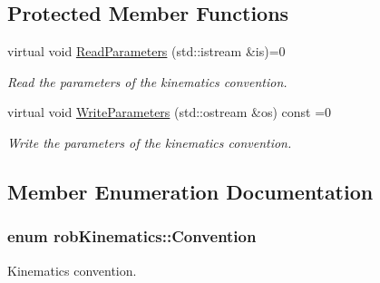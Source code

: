 \subsection*{Protected Member Functions}
\begin{DoxyCompactItemize}
\item 
virtual void \hyperlink{classrob_kinematics_a0bcf44445361f6c764cd0565c8f6b3c0}{Read\-Parameters} (std\-::istream \&is)=0
\begin{DoxyCompactList}\small\item\em Read the parameters of the kinematics convention. \end{DoxyCompactList}\item 
virtual void \hyperlink{classrob_kinematics_afbfe67b8baaed6fdee85bef681f195e1}{Write\-Parameters} (std\-::ostream \&os) const =0
\begin{DoxyCompactList}\small\item\em Write the parameters of the kinematics convention. \end{DoxyCompactList}\end{DoxyCompactItemize}


\subsection{Member Enumeration Documentation}
\hypertarget{classrob_kinematics_a298703e920da583d1f6aa60c8f65ca78}{
\subsubsection[{Convention}]{\setlength{\rightskip}{0pt plus 5cm}enum {\bf rob\-Kinematics\-::\-Convention}}}\label{classrob_kinematics_a298703e920da583d1f6aa60c8f65ca78}


Kinematics convention. 


